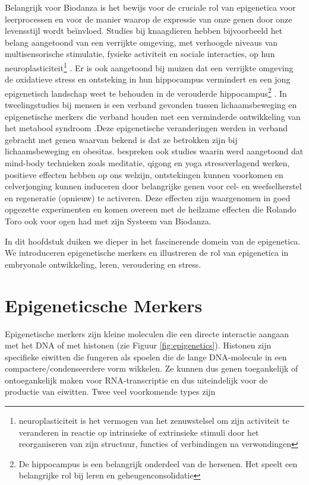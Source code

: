 \documentclass[
  11pt,
]{book}
\begin{document}
Belangrijk voor Biodanza is het bewijs voor de cruciale rol van epigenetica voor leerprocessen en voor de manier waarop de expressie van onze genen door onze levensstijl wordt beïnvloed.
Studies bij knaagdieren hebben bijvoorbeeld het belang aangetoond van een verrijkte omgeving, met verhoogde niveaus van multisensorische stimulatie, fysieke activiteit en sociale interacties, op hun neuroplasticiteit\footnote{neuroplasticiteit is het vermogen van het zenuwstelsel om zijn activiteit te veranderen in reactie op intrinsieke of extrinsieke stimuli door het reorganiseren van zijn structuur, functies of verbindingen na verwondingen} \citep{baroncelli2010}. Er is ook aangetoond bij muizen dat een verrijkte omgeving de oxidatieve stress en ontsteking in hun hippocampus vermindert \citep{grinan2016} en een jong epigenetisch landschap weet te behouden in de verouderde hippocampus\footnote{De hippocampus is een belangrijk onderdeel van de hersenen. Het speelt een belangrijke rol bij leren en geheugenconsolidatie} \citep{zocher2021}.
In tweelingstudies bij mensen is een verband gevonden tussen lichaamsbeweging en epigenetische merkers die verband houden met een verminderde ontwikkeling van het metabool syndroom \citep{Duncan2022}.Deze epigenetische veranderingen werden in verband gebracht met genen waarvan bekend is dat ze betrokken zijn bij lichaamsbeweging en obesitas. \citet{BlackburnEpel2017} bespreken ook studies waarin werd aangetoond dat mind-body technieken zoals meditatie, qigong en yoga stressverlagend werken, positieve effecten hebben op ons welzijn, ontstekingen kunnen voorkomen en celverjonging kunnen induceren door belangrijke genen voor cel- en weefselherstel en regeneratie (opnieuw) te activeren. Deze effecten zijn waargenomen in goed opgezette experimenten en komen overeen met de heilzame effecten die Rolando Toro ook voor ogen had met zijn Systeem van Biodanza.

In dit hoofdstuk duiken we dieper in het fascinerende domein van de epigenetica. We introduceren epigenetische merkers en illustreren de rol van epigenetica in embryonale ontwikkeling, leren, veroudering en stress.

\hypertarget{epigeneticsche-merkers}{%
\section{Epigeneticsche Merkers}\label{epigeneticsche-merkers}}

Epigenetische merkers zijn kleine moleculen die een directe interactie aangaan met het DNA of met histonen (zie Figuur \ref{fig:epigenetics}). Histonen zijn specifieke eiwitten die fungeren als spoelen die de lange DNA-molecule in een compactere/condenseerdere vorm wikkelen. Ze kunnen dus genen toegankelijk of ontoegankelijk maken voor RNA-transcriptie en dus uiteindelijk voor de productie van eiwitten. Twee veel voorkomende types zijn
\end{document}
